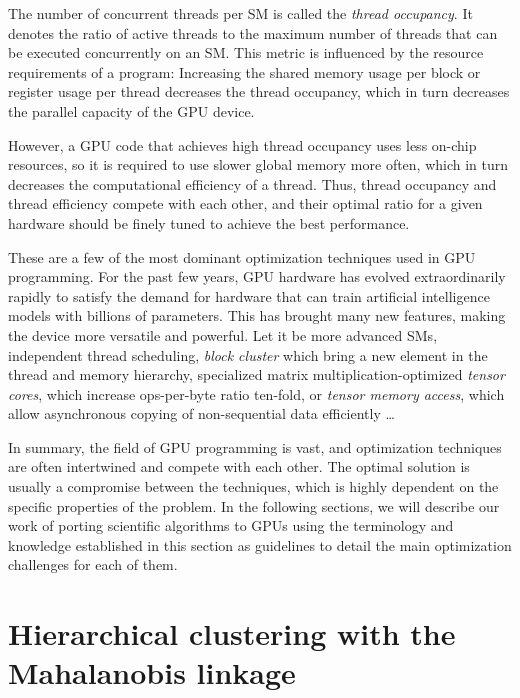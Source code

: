 The number of concurrent threads per SM is called the \emph{thread occupancy}. It denotes the ratio of active threads to the maximum number of threads that can be executed concurrently on an SM. This metric is influenced by the resource requirements of a program: Increasing the shared memory usage per block or register usage per thread decreases the thread occupancy, which in turn decreases the parallel capacity of the GPU device.

However, a GPU code that achieves high thread occupancy uses less on-chip resources, so it is required to use slower global memory more often, which in turn decreases the computational efficiency of a thread. Thus, thread occupancy and thread efficiency compete with each other, and their optimal ratio for a given hardware should be finely tuned to achieve the best performance.

\vspace{1cm}

These are a few of the most dominant optimization techniques used in GPU programming. For the past few years, GPU hardware has evolved extraordinarily rapidly to satisfy the demand for hardware that can train artificial intelligence models with billions of parameters. This has brought many new features, making the device more versatile and powerful. Let it be more advanced SMs, independent thread scheduling, \emph{block cluster} which bring a new element in the thread and memory hierarchy, specialized matrix multiplication-optimized \emph{tensor cores}, which increase ops-per-byte ratio ten-fold, or \emph{tensor memory access}, which allow asynchronous copying of non-sequential data efficiently \dots

In summary, the field of GPU programming is vast, and optimization techniques are often intertwined and compete with each other. The optimal solution is usually a compromise between the techniques, which is highly dependent on the specific properties of the problem. In the following sections, we will describe our work of porting scientific algorithms to GPUs using the terminology and knowledge established in this section as guidelines to detail the main optimization challenges for each of them.


\section{Hierarchical clustering with the Mahalanobis linkage}
\label{sec:maha}

